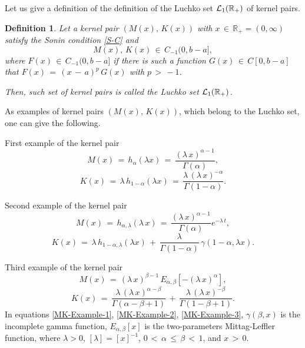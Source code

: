 \documentclass[12pt]{article}
\newtheorem{Definition}{Definition}
\begin{document}
Let us give a definition of the definition of the Luchko set ${\cal L}_{1}(\mathbb{R}_{+})$ of kernel pairs. 

\begin{Definition}
Let a kernel pair $( M(x) , \, K(x))$ with 
$x \, \in \, \mathbb{R}_{+} = (0,\infty)$ 
satisfy the Sonin condition \eqref{S-C} and
\begin{equation}
M(x) , \, K(x) \, 
\in \, C_{-1} (0,b-a] ,
\end{equation}
where $F(x) \, \in \, C_{-1} (0,b-a]$ 
if there is such a function 
$G(x) \, \in \, C[0,b-a]$ 
that $F(x) \, = \, (x \, - \, a)^{p} \, G(x)$ 
with $p \, > \, -1$. 

Then, such set of kernel pairs is called the Luchko set ${\cal L}_{1}(\mathbb{R}_{+})$. 
\end{Definition}

As examples of kernel pairs $(M(x), \, K(x))$, which 
belong to the Luchko set, one can give the following. 

First example of the kernel pair
\[
M(x) \, = \,
h_{\alpha}(\lambda x) \, = \, 
\frac{ (\lambda \, x)^{\alpha -1}}{\Gamma(\alpha)} ,
\]
\begin{equation} \label{MK-Example-1} 
K(x) \, = \,
\lambda \, h_{1-\alpha}(\lambda x) \, = \, 
\frac{\lambda \, (\lambda \, x)^{-\alpha}}{\Gamma(1-\alpha)} .
\end{equation}

Second example of the kernel pair
\[
M(x) \, = \,
h_{\alpha,\lambda}(\lambda \, x) \, = \, 
\frac{(\lambda \, x)^{\alpha-1}}{\Gamma(\alpha)} e^{- \lambda \, t} ,
\]
\begin{equation} \label{MK-Example-2}
K(x) \, = \, 
\lambda \, h_{1-\alpha,\lambda}(\lambda x) \, + \, 
\frac{\lambda}{\Gamma(1-\alpha)} \, 
\gamma(1-\alpha,\lambda x) .
\end{equation}

Third example of the kernel pair
\[
M(x) \, = \, (\lambda \, x)^{\beta -1} \, 
E_{\alpha,\beta} [-(\lambda \, x)^{\alpha} ] ,
\]
\begin{equation} \label{MK-Example-3}
K(x) \, = \,
\frac{\lambda \, (\lambda \, x)^{\alpha - \beta}}{\Gamma(\alpha-\beta+1)} 
\, + \,
\frac{\lambda \, (\lambda \, x)^{- \beta}}{\Gamma(1-\beta+1)} .
\end{equation}
In equations \eqref{MK-Example-1}, \eqref{MK-Example-2}, \eqref{MK-Example-3}, $\gamma(\beta,x)$ is the incomplete gamma function, $E_{\alpha,\beta}[x]$ is the two-parameters Mittag-Leffler function, where $\lambda >0$, $[\lambda]=[x]^{-1}$, 
$0 \, < \, \alpha \, \le \, \beta \, < \, 1$, and $x \, > \, 0$. 
\end{document}
